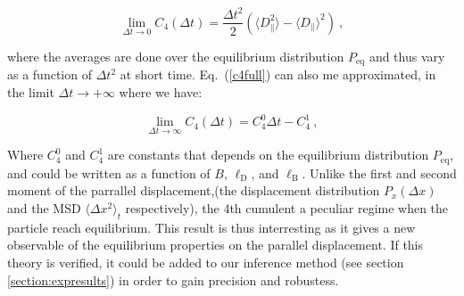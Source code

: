 \begin{equation}
	\lim\limits_{\Delta t \rightarrow 0 } C_4 (\Delta t) = \frac{\Delta t ^2}{2}
	\left(
	\langle D_\parallel ^2 \rangle - \langle D _\parallel \rangle ^2 
	\right)~,
\end{equation}

where the averages are done over the equilibrium distribution $P_\mathrm{eq}$ and thus vary as a function of $\Delta t ^2$ at short time. Eq.~(\ref{c4full}) can also me approximated, in the limit $\Delta t \rightarrow + \infty$ where we have:

\begin{equation}
	\lim\limits_{\Delta t \rightarrow \infty } C_4 (\Delta t) = C_4 ^0 \Delta t - C^1 _4 ~,
\end{equation}

Where $ C_4 ^0$ and $ C_4 ^1$ are constants that depends on the equilibrium distribution $P_\mathrm{eq}$, and could be written as a function of $B$, $\ell _ \mathrm{D}$, and $\ell _\mathrm{B}$. Unlike the first and second moment of the parrallel displacement,(the displacement distribution $P_x(\Delta x)$ and the \gls{MSD} $\langle \Delta x ^2 \rangle_t $ respectively), the 4th cumulent a peculiar regime when the particle reach equilibrium. This result is thus interresting as it gives a new observable of the equilibrium properties on the parallel displacement. If this theory is verified, it could be added to our inference method (see section \ref{section:expresults}) in order to gain precision and robustess.

